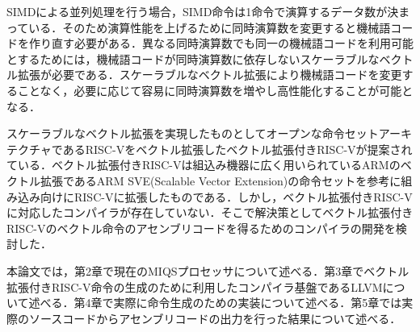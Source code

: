 SIMDによる並列処理を行う場合，SIMD命令は1命令で演算するデータ数が決まっている．そのため演算性能を上げるために同時演算数を変更すると機械語コードを作り直す必要がある．異なる同時演算数でも同一の機械語コードを利用可能とするためには，機械語コードが同時演算数に依存しないスケーラブルなベクトル拡張が必要である．スケーラブルなベクトル拡張により機械語コードを変更することなく，必要に応じて容易に同時演算数を増やし高性能化することが可能となる．

スケーラブルなベクトル拡張を実現したものとしてオープンな命令セットアーキテクチャであるRISC-V\cite{bib:risc-v}をベクトル拡張したベクトル拡張付きRISC-V\cite{bib:kimura}が提案されている．ベクトル拡張付きRISC-Vは組込み機器に広く用いられているARMのベクトル拡張であるARM SVE(Scalable Vector Extension)\cite{bib:arm_sve}の命令セットを参考に組み込み向けにRISC-Vに拡張したものである．しかし，ベクトル拡張付きRISC-Vに対応したコンパイラが存在していない．そこで解決策としてベクトル拡張付きRISC-Vのベクトル命令のアセンブリコードを得るためのコンパイラの開発を検討した．

本論文では，第2章で現在のMIQSプロセッサについて述べる．第3章でベクトル拡張付きRISC-V命令の生成のために利用したコンパイラ基盤であるLLVM\cite{bib:llvm}について述べる．第4章で実際に命令生成のための実装について述べる．第5章では実際のソースコードからアセンブリコードの出力を行った結果について述べる．